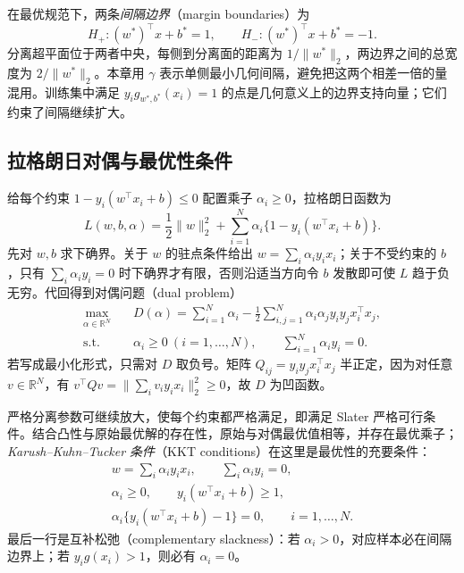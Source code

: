 在最优规范下，两条\emph{间隔边界}（margin boundaries）为
\[
  H_+:(w^*)^\top x+b^*=1,
  \qquad H_-:(w^*)^\top x+b^*=-1.
\]
分离超平面位于两者中央，每侧到分离面的距离为 $1/\lVert w^*\rVert_2$，两边界之间的总宽度为 $2/\lVert w^*\rVert_2$。本章用 $\gamma$ 表示单侧最小几何间隔，避免把这两个相差一倍的量混用。训练集中满足 $y_i g_{w^*,b^*}(x_i)=1$ 的点是几何意义上的边界支持向量；它们约束了间隔继续扩大。

\subsection{拉格朗日对偶与最优性条件}
\label{subsec:lihang-svm-hard-dual}

给每个约束 $1-y_i(w^\top x_i+b)\le0$ 配置乘子 $\alpha_i\ge0$，拉格朗日函数为
\begin{equation}
  L(w,b,\alpha)=\frac12\lVert w\rVert_2^2
    +\sum_{i=1}^{N}\alpha_i\{1-y_i(w^\top x_i+b)\}.
  \label{eq:lihang-svm-hard-lagrangian}
\end{equation}
先对 $w,b$ 求下确界。关于 $w$ 的驻点条件给出 $w=\sum_i\alpha_i y_i x_i$；关于不受约束的 $b$，只有 $\sum_i\alpha_i y_i=0$ 时下确界才有限，否则沿适当方向令 $b$ 发散即可使 $L$ 趋于负无穷。代回得到对偶问题（dual problem）
\begin{equation}
  \begin{aligned}
    \max_{\alpha\in\mathbb R^N}\quad
      &D(\alpha)=\sum_{i=1}^{N}\alpha_i
       -\frac12\sum_{i,j=1}^{N}\alpha_i\alpha_j y_i y_j x_i^\top x_j,\\
    \text{s.t.}\quad
      &\alpha_i\ge0\ (i=1,\ldots,N),\qquad
       \sum_{i=1}^{N}\alpha_i y_i=0.
  \end{aligned}
  \label{eq:lihang-svm-hard-dual}
\end{equation}
若写成最小化形式，只需对 $D$ 取负号。矩阵 $Q_{ij}=y_i y_j x_i^\top x_j$ 半正定，因为对任意 $v\in\mathbb R^N$，有 $v^\top Qv=\lVert\sum_i v_i y_i x_i\rVert_2^2\ge0$，故 $D$ 为凹函数。

严格分离参数可继续放大，使每个约束都严格满足，即满足 Slater 严格可行条件。结合凸性与原始最优解的存在性，原始与对偶最优值相等，并存在最优乘子；\emph{Karush--Kuhn--Tucker 条件}（KKT conditions）在这里是最优性的充要条件：
\begin{equation}
  \begin{gathered}
    w=\sum_i\alpha_i y_i x_i,\qquad \sum_i\alpha_i y_i=0,\\
    \alpha_i\ge0,\qquad y_i(w^\top x_i+b)\ge1,\\
    \alpha_i\{y_i(w^\top x_i+b)-1\}=0,
       \qquad i=1,\ldots,N.
  \end{gathered}
  \label{eq:lihang-svm-hard-kkt}
\end{equation}
最后一行是互补松弛（complementary slackness）：若 $\alpha_i>0$，对应样本必在间隔边界上；若 $y_i g(x_i)>1$，则必有 $\alpha_i=0$。

